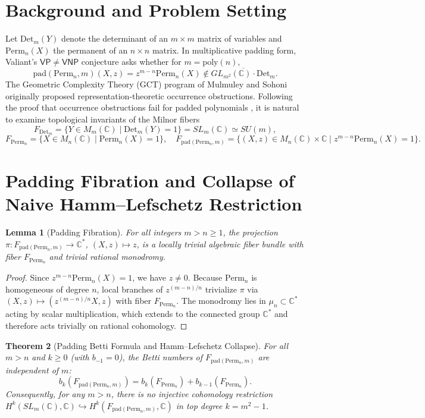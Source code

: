 \documentclass[11pt,a4paper]{article}
\newtheorem{theorem}{Theorem}[section]
\newtheorem{lemma}[theorem]{Lemma}
\theoremstyle{definition}
\begin{document}
\section{Background and Problem Setting}

Let $\text{Det}_m(Y)$ denote the determinant of an $m \times m$ matrix of variables and $\text{Perm}_n(X)$ the permanent of an $n \times n$ matrix. In multiplicative padding form, Valiant's $\mathsf{VP} \neq \mathsf{VNP}$ conjecture asks whether for $m = \text{poly}(n)$,
$$\text{pad}(\text{Perm}_n, m)(X, z) = z^{m-n}\text{Perm}_n(X) \notin \overline{GL_{m^2}(\mathbb{C}) \cdot \text{Det}_m}.$$
The Geometric Complexity Theory (GCT) program of Mulmuley and Sohoni \cite{ms1, ms2} originally proposed representation-theoretic occurrence obstructions. Following the proof that occurrence obstructions fail for padded polynomials \cite{ip17, bip19}, it is natural to examine topological invariants of the Milnor fibers
$$F_{\text{Det}_m} = \{ Y \in M_m(\mathbb{C}) \mid \text{Det}_m(Y) = 1 \} = SL_m(\mathbb{C}) \simeq SU(m),$$
$$F_{\text{Perm}_n} = \{ X \in M_n(\mathbb{C}) \mid \text{Perm}_n(X) = 1 \}, \quad F_{\text{pad}(\text{Perm}_n, m)} = \{ (X, z) \in M_n(\mathbb{C}) \times \mathbb{C} \mid z^{m-n}\text{Perm}_n(X) = 1 \}.$$

\section{Padding Fibration and Collapse of Naive Hamm--Lefschetz Restriction}

\begin{lemma}[Padding Fibration]
\label{lem:bundle}
For all integers $m > n \ge 1$, the projection $\pi: F_{\text{pad}(\text{Perm}_n, m)} \to \mathbb{C}^*$, $(X, z) \mapsto z$, is a locally trivial algebraic fiber bundle with fiber $F_{\text{Perm}_n}$ and trivial rational monodromy.
\end{lemma}

\begin{proof}
Since $z^{m-n}\text{Perm}_n(X) = 1$, we have $z \neq 0$. Because $\text{Perm}_n$ is homogeneous of degree $n$, local branches of $z^{(m-n)/n}$ trivialize $\pi$ via $(X, z) \mapsto (z^{(m-n)/n} X, z)$ with fiber $F_{\text{Perm}_n}$. The monodromy lies in $\mu_n \subset \mathbb{C}^*$ acting by scalar multiplication, which extends to the connected group $\mathbb{C}^*$ and therefore acts trivially on rational cohomology.
\end{proof}

\begin{theorem}[Padding Betti Formula and Hamm--Lefschetz Collapse]
\label{thm:padding_betti}
For all $m > n$ and $k \ge 0$ (with $b_{-1} = 0$), the Betti numbers of $F_{\text{pad}(\text{Perm}_n, m)}$ are independent of $m$:
$$b_k(F_{\text{pad}(\text{Perm}_n, m)}) = b_k(F_{\text{Perm}_n}) + b_{k-1}(F_{\text{Perm}_n}).$$
Consequently, for any $m > n$, there is no injective cohomology restriction $H^k(SL_m(\mathbb{C}), \mathbb{C}) \hookrightarrow H^k(F_{\text{pad}(\text{Perm}_n, m)}, \mathbb{C})$ in top degree $k = m^2 - 1$.
\end{theorem}
\end{document}

